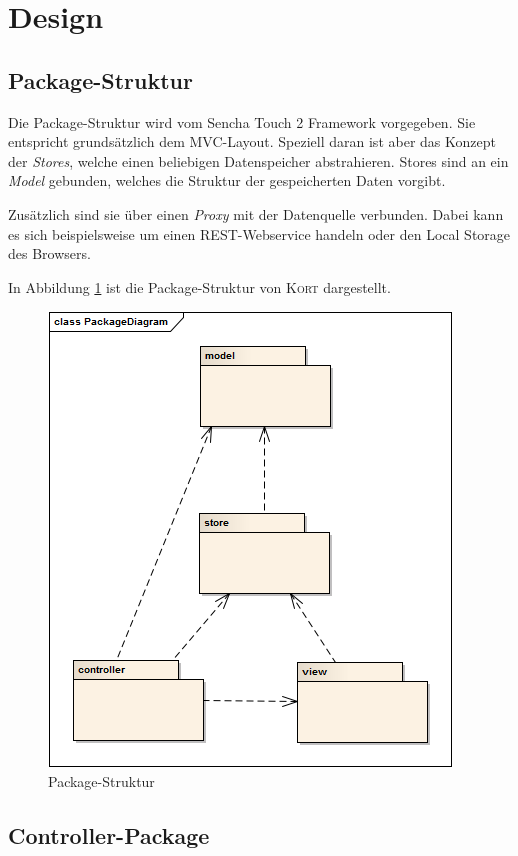 \section{Design}

\subsection{Package-Struktur}

Die Package-Struktur wird vom Sencha Touch 2 Framework vorgegeben. Sie entspricht grundsätzlich dem MVC-Layout.
Speziell daran ist aber das Konzept der \emph{Stores}, welche einen beliebigen Datenspeicher abstrahieren.
Stores sind an ein \emph{Model} gebunden, welches die Struktur der gespeicherten Daten vorgibt.

Zusätzlich sind sie über einen \emph{Proxy} mit der Datenquelle verbunden.
Dabei kann es sich beispielsweise um einen \gls{REST}-Webservice handeln oder den \gls{Local Storage} des Browsers.

In Abbildung \ref{image-kort-packagediagram} ist die Package-Struktur von \textsc{Kort} dargestellt.

\begin{figure}[H]
	\centering
	\includegraphics[scale=0.7]{images/uml/kort-packagediagram}
	\caption{Package-Struktur}
	\label{image-kort-packagediagram}
\end{figure}

\subsection{Controller-Package}

